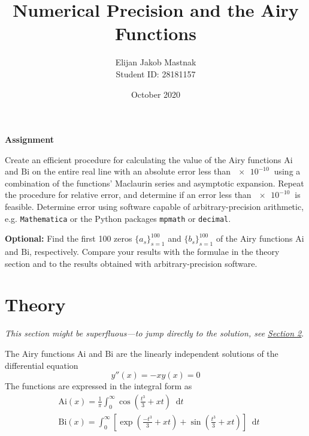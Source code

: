 \documentclass[11pt, a4paper]{article}
\newcommand{\diff}{\mathop{}\!\mathrm{d}} %
\newcommand{\Ai}{\mathrm{Ai}}
\newcommand{\Bi}{\mathrm{Bi}}
\begin{document}
\title{Numerical Precision and the Airy Functions}
\author{Elijan Jakob Mastnak\\[1mm]\small{Student ID: 28181157}}
\date{October 2020}
\maketitle

%

\tableofcontents




\newpage

\begin{center}
\textbf{Assignment}
\end{center}
Create an efficient procedure for calculating the value of the Airy functions $ \Ai $ and $ \Bi $ on the entire real line with an absolute error less than $ \SI{e-10}{} $ using a combination of the functions' Maclaurin series and asymptotic expansion. Repeat the procedure for relative error, and determine if an error less than $ \SI{e-10}{} $ is feasible. Determine error using software capable of arbitrary-precision arithmetic, e.g. \texttt{Mathematica} or the Python packages \texttt{mpmath} or \texttt{decimal}.

\vspace{3mm}
\textbf{Optional:} Find the first 100 zeros $ \{a_{s}\}_{s=1}^{100} $ and $ \{b_{s}\}_{s=1}^{100} $ of the Airy functions $ \Ai $ and $ \Bi $, respectively. Compare your results with the formulae in the theory section and to the results obtained with arbitrary-precision software.


\section{Theory}
\vspace{-2mm}
\textit{This section might be superfluous---to jump directly to the solution, see \hyperref[airy:s:solution]{\underline{Section 2}}}.

\vspace{3mm}

The Airy functions $ \Ai $ and $ \Bi $ are the linearly independent solutions of the differential equation
\begin{equation*}
	y''(x) = -xy(x) = 0
\end{equation*}
The functions are expressed in the integral form as
\begin{align*}
	&\Ai(x) = \frac{1}{\pi} \int_{0}^{\infty} \cos\left(\frac{t^{3}}{3} + xt\right)\diff t\\
	&\Bi(x) = \int_{0}^{\infty} \left[\exp(\frac{-t^{3}}{3} + xt) + \sin(\frac{t^{3}}{3} + xt)\right]\diff t
\end{align*}
\end{document}

